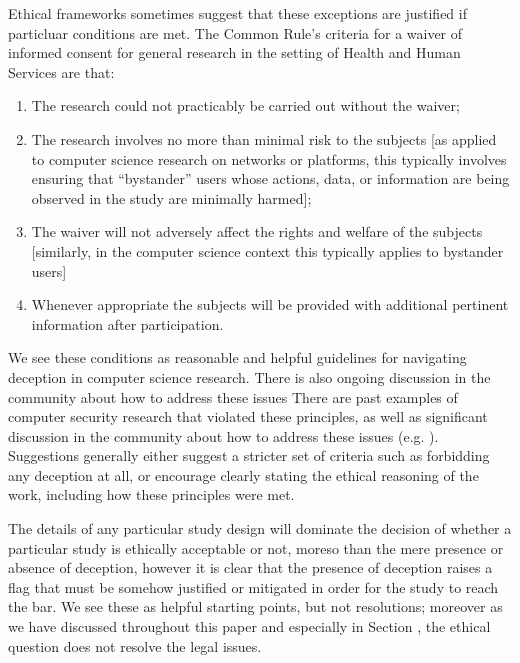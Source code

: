 Ethical frameworks sometimes suggest that these exceptions are justified if particluar conditions are met.
The Common Rule's criteria \cite{InformedConsentFAQs} for a waiver of informed consent for general research in the setting of Health and Human Services are that:
\begin{enumerate}
\item The research could not practicably be carried out without the waiver;
\item The research involves no more than minimal risk to the subjects [as applied to computer science research on networks or platforms, this typically involves ensuring that ``bystander'' users whose actions, data, or information are being observed in the study are minimally harmed];
\item The waiver will not adversely affect the rights and welfare of the subjects [similarly, in the computer science context this typically applies to bystander users]
\item Whenever appropriate the subjects will be provided with additional pertinent information after participation.
\end{enumerate}
We see these conditions as reasonable and helpful guidelines for navigating deception in computer science research.
There is also ongoing discussion in the community about how to address these issues
There are past examples of computer security research that violated these principles, as well as significant discussion in the community about how to address these issues (e.g. \cite{narayananNoEncoreEncore2015,jakobssonWhyHowPerform2008,partridgeEthicalConsiderationsNetwork2016,wendlerDeceptionPursuitScience2004,cranorConferenceSubmissionReview,finnEthicsGovernanceDevelopment2023,kohnoEthicalFrameworksComputer}). Suggestions generally either  suggest a stricter set of criteria such as forbidding any deception at all, or encourage clearly stating the ethical reasoning of the work, including how these principles were met.

The details of any particular study design will dominate the decision of whether a particular study is ethically acceptable or not, moreso than the mere presence or absence of deception, however it is clear that the presence of deception raises a flag that must be somehow justified or mitigated in order for the study to reach the bar.
We see these as helpful starting points, but not resolutions; moreover as we have discussed throughout this paper and especially in Section , the ethical question does not resolve the legal issues.

